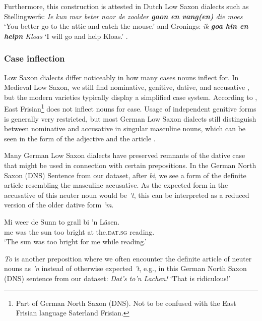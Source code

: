 \documentclass[output=paper,colorlinks,citecolor=brown]{langscibook}
\begin{document}
Furthermore, this construction is attested in Dutch Low Saxon dialects such as Stellingwerfs: \textit{Ie kun mar beter naor de zoolder \textbf{gaon en vang(en)} die moes} `You better go to the attic and catch the mouse.' \citep[191]{Bloemhoff2008a} %
and Gronings: \textit{ik \textbf{goa hin en helpn} Kloas} `I will go and help Kloas.' \citep[114]{vanBree2008}.


\subsubsection{Case inflection}\label{feature:case}
Low Saxon dialects differ noticeably in how many cases nouns inflect for. In Medieval Low Saxon, we still find nominative, genitive, dative, and accusative \citep{Lasch1974}, but the modern varieties typically display a simplified case system. According to \citet[62]{Luecht2016}, East Frisian\footnote{Part of German North Saxon (DNS). Not to be confused with the East Frisian language Saterland Frisian.} does not inflect nouns for case. Usage of independent genitive forms is generally very restricted, but most German Low Saxon dialects still distinguish between nominative and accusative in singular masculine nouns, which can be seen in the form of the adjective and the article \citep[144, 191]{LindowEtAl1998}. 

Many German Low Saxon dialects have preserved remnants of the dative case that might be used in connection with certain prepositions. In the German North Saxon (DNS) Sentence  from our dataset, after \textit{bi}, we see a form of the definite article resembling the masculine accusative. As the expected form in the accusative of this neuter noun would be \textit{'t}, this can be interpreted as a reduced version of the older dative form \textit{'m}.

\ea\label{dative_dns}
\gll Mi   weer   de   Sunn   to   grall   bi   'n   Läsen. \\
me    was    the    sun   too    bright    at    the.\textsc{dat}.\textsc{sg}    reading. \\
\glt `The sun was too bright for me while reading.'
\z



\textit{To} is another preposition where we often encounter the definite article of neuter nouns as \textit{'n} instead of otherwise expected \textit{'t}, e.g., in this German North Saxon (DNS) sentence from our dataset: \textit{Dat's to'n Lachen!} `That is ridiculous!' 
\end{document}
